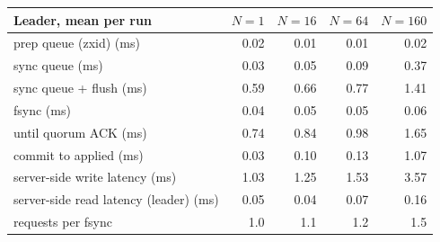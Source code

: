\begin{tabular}{@{}lrrrr@{}}
\toprule
Leader, mean per run & $N=1$ & $N=16$ & $N=64$ & $N=160$ \\
\midrule
prep queue (zxid) (ms) & 0.02 & 0.01 & 0.01 & 0.02 \\
sync queue (ms) & 0.03 & 0.05 & 0.09 & 0.37 \\
sync queue + flush (ms) & 0.59 & 0.66 & 0.77 & 1.41 \\
fsync (ms) & 0.04 & 0.05 & 0.05 & 0.06 \\
until quorum ACK (ms) & 0.74 & 0.84 & 0.98 & 1.65 \\
commit to applied (ms) & 0.03 & 0.10 & 0.13 & 1.07 \\
server-side write latency (ms) & 1.03 & 1.25 & 1.53 & 3.57 \\
server-side read latency (leader) (ms) & 0.05 & 0.04 & 0.07 & 0.16 \\
requests per fsync & 1.0 & 1.1 & 1.2 & 1.5 \\
\bottomrule
\end{tabular}
